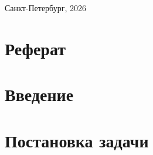 \documentclass[11pt, a4paper]{article}
\begin{document}
	\vspace{35pt}
	
	\begin{center}
		Санкт-Петербург, 2026
	\end{center}
	
	
	\newpage
	\section*{Реферат}
	\hfill
	
	
	
	\newpage
	
	\tableofcontents
	
	\newpage
	\section*{Введение}
	\hfill
	
	
	
	\newpage
	\section{Постановка задачи}
	\hfill
	
\end{document}
